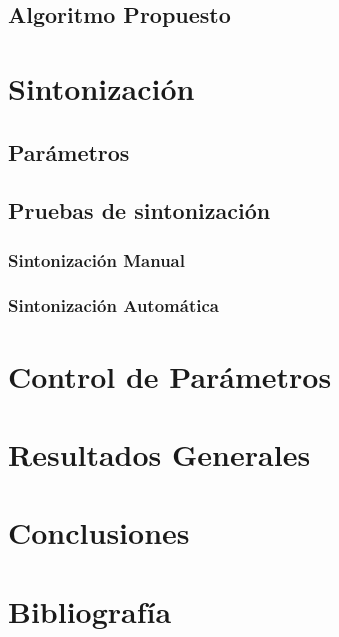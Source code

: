 \documentclass[letter, 10pt]{article}
\begin{document}
\newpage
\subsection{Algoritmo Propuesto}
\label{sec:propuesta}



\newpage
\section{Sintonización}
\label{sec:sintonizacion}

\subsection{Parámetros}
\label{sec:parametros}


\newpage
\subsection{Pruebas de sintonización}
\label{sec:pruebasSintonizacion}
\subsubsection{Sintonización Manual}

\subsubsection{Sintonización Automática}


\newpage
\section{Control de Parámetros}
\label{sec:control}


\newpage
\section{Resultados Generales}
\label{sec:resultados}


\newpage
\section{Conclusiones}
\label{sec:conclusiones}


\newpage
\section{Bibliografía}

\end{document}
